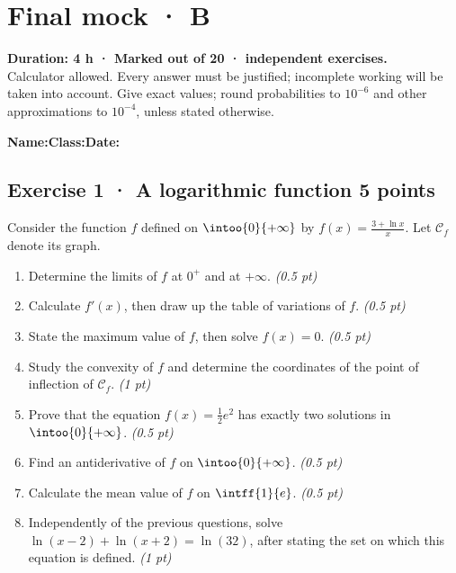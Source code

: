 \fi

\fi

\ifmxteacher

\mxnewpage{}\label{sujet:9-4}

\section*{Final mock · B}


\textbf{Duration: 4 h · Marked out of 20 ·  independent exercises.}\\Calculator allowed. Every answer must be justified; incomplete working will be taken into account. Give exact values; round probabilities to $10^{-6}$ and other approximations to $10^{-4}$, unless stated otherwise.

\smallskip\textbf{Name:}\enspace\dotfill\quad\textbf{Class:}\enspace\dotfill\quad\textbf{Date:}\enspace\dotfill

\subsection*{Exercise 1 · A logarithmic function \hfill 5 points}Consider the function $f$ defined on $\intoo{0}{+\infty}$ by $f(x)=\frac{3+\ln x}x$. Let $\mathcal C_f$ denote its graph.

\begin{enumerate}

\item Determine the limits of $f$ at $0^+$ and at $+\infty$. \hfill\textit{(0.5 pt)}

\item Calculate $f' (x)$, then draw up the table of variations of $f$. \hfill\textit{(0.5 pt)}

\item State the maximum value of $f$, then solve $f(x)=0$. \hfill\textit{(0.5 pt)}

\item Study the convexity of $f$ and determine the coordinates of the point of inflection of $\mathcal C_f$. \hfill\textit{(1 pt)}

\item Prove that the equation $f(x)=\frac12 e^{2}$ has exactly two solutions in $\intoo{0}{+\infty}$. \hfill\textit{(0.5 pt)}

\item Find an antiderivative of $f$ on $\intoo{0}{+\infty}$. \hfill\textit{(0.5 pt)}

\item Calculate the mean value of $f$ on $\intff{1}{e}$. \hfill\textit{(0.5 pt)}

\item Independently of the previous questions, solve $\ln(x-2)+\ln(x+2)=\ln(32)$, after stating the set on which this equation is defined. \hfill\textit{(1 pt)}

\end{enumerate}

